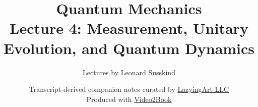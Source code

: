 \documentclass[11pt,oneside]{book}
\begin{document}
\frontmatter
\hypersetup{pageanchor=false}
\title{Quantum Mechanics\\[0.45em]
\large Lecture 4: Measurement, Unitary Evolution, and Quantum Dynamics}
\author{Lectures by Leonard Susskind}
\date{Transcript-derived companion notes curated by
\href{https://lazying.art}{LazyingArt LLC}\\[0.35em]
\small Produced with
\href{https://github.com/lachlanchen/Video2Book}{Video2Book}}
\maketitle
\clearpage
\hypersetup{pageanchor=true}
\mainmatter

\end{document}
